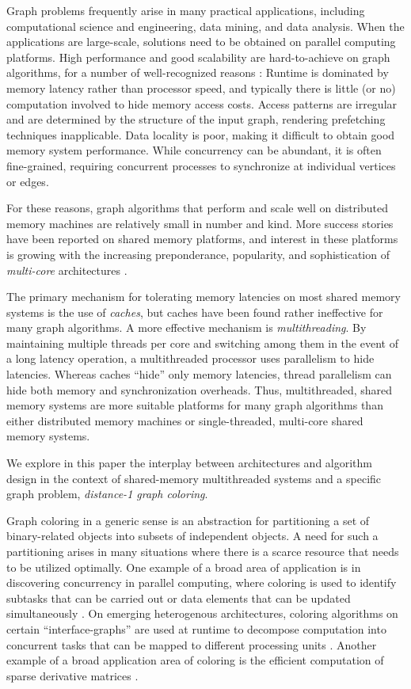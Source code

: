 \documentclass{article}
\begin{document}
Graph problems  frequently arise in many practical applications, including
computational science and engineering, data mining, and data analysis.
When the applications are large-scale, solutions 
need to be obtained on parallel computing platforms.
High performance and good scalability are hard-to-achieve on
graph algorithms, for a number of well-recognized reasons 
\cite{DBLP:journals/ppl/LumsdaineGHB07}:
Runtime is dominated by memory latency rather than processor speed, and
typically there is little (or no) computation involved to hide memory access costs. 
Access patterns are irregular and are determined by the structure of the input graph,
rendering prefetching techniques inapplicable. 
Data locality is poor, making it difficult to obtain good memory system performance. 
While concurrency can be abundant, it is often fine-grained, requiring concurrent processes to
synchronize at individual vertices or edges.

For these reasons, graph algorithms that perform and scale well on
distributed memory machines are relatively small in number and kind. 
More success stories have been reported on shared memory platforms, 
and interest in these platforms is growing with the increasing preponderance, 
popularity, and sophistication of {\em multi-core} architectures 
\cite{Kurzak+,Bader+:Multicore-graphalgs,Madduri+:Multithreaded-graphalgs}. 

The primary mechanism for tolerating memory latencies on most
shared memory systems is the use of {\em caches}, but caches have been found rather 
ineffective for many graph algorithms. A more effective mechanism is {\em multithreading}. 
By maintaining multiple threads per core and switching among them in the event of a long
latency operation, a multithreaded processor uses parallelism to hide latencies. 
Whereas caches ``hide'' only memory latencies, thread parallelism can hide both 
memory and synchronization overheads. 
Thus, multithreaded, shared memory systems are more suitable
platforms for many graph algorithms than either distributed memory machines or 
single-threaded, multi-core shared memory systems. 

We explore in this paper the interplay between architectures and algorithm design
in the context of shared-memory multithreaded systems and a specific graph problem, 
{\em distance-1 graph coloring}.

Graph coloring in a generic sense is an abstraction for partitioning
a set of binary-related objects into subsets of independent objects. A need for such a
partitioning arises in many situations where there is a scarce resource that needs to be
utilized optimally. 
One example of a broad area of application is  
in discovering concurrency in parallel computing, 
where coloring is used to identify subtasks that can be carried out or data elements
that can be updated simultaneously \cite{jones94scalable-v2,saad96ilum-v2,hysom01}.
On emerging heterogenous architectures,  coloring algorithms on certain ``interface-graphs'' are used at runtime to decompose computation into concurrent tasks that can be mapped to different processing units \cite{Listz}.    
Another example of a broad application area of coloring is the efficient computation of 
sparse derivative matrices \cite{CoMo:83,CoMo:84,GMP05}.
\end{document}
